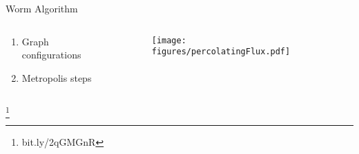 \documentclass[10pt]{beamer}
\newcommand\blfootnote[1]{%
  \begingroup
  \renewcommand\thefootnote{}\footnote{#1}%
  \addtocounter{footnote}{-1}%
  \endgroup
}
\begin{document}
\begin{frame}{Worm Algorithm}
    \begin{columns}[c]
        \begin{column}{0.4\textwidth}
            \begin{enumerate}[$\bullet$]
                \item Graph configurations
                \item Metropolis steps
            \end{enumerate}
        \end{column}
        \begin{column}{0.7\textwidth}  %
            \begin{figure}[h!]
                \centering
                \texttt{[image: figures/percolatingFlux.pdf]}
            \end{figure}
        \end{column}
    \end{columns}
    \blfootnote{bit.ly/2qGMGnR}
\end{frame}
\end{document}

